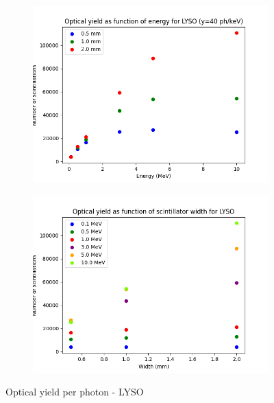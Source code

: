 \documentclass{article}
\begin{document}
\begin{figure}[H]
\centering
\begin{subfigure}{.5\textwidth}
  \centering
  \includegraphics[width=\linewidth]{images/task3/scintills_energy_LYSO.png}
  \caption{}
\end{subfigure}%
\begin{subfigure}{.5\textwidth}
  \centering
  \includegraphics[width=\linewidth]{images/task3/scintills_width_LYSO_part.png}
  \caption{}
\end{subfigure}
\caption{Optical yield per photon - LYSO}
\end{figure}
\end{document}
